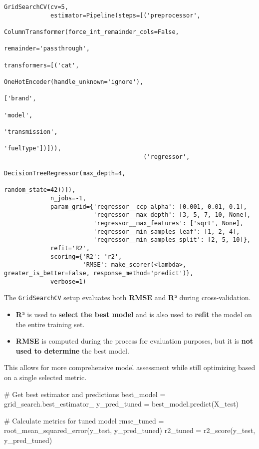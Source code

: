 \documentclass[
  letterpaper,
  DIV=11,
  numbers=noendperiod]{scrreprt}
\newenvironment{Shaded}{\begin{snugshade}}{\end{snugshade}}
\newcommand{\CommentTok}[1]{\textcolor[rgb]{0.37,0.37,0.37}{#1}}
\newcommand{\NormalTok}[1]{\textcolor[rgb]{0.00,0.23,0.31}{#1}}
\newcommand{\OperatorTok}[1]{\textcolor[rgb]{0.37,0.37,0.37}{#1}}
\providecommand{\tightlist}{%
  \setlength{\itemsep}{0pt}\setlength{\parskip}{0pt}}\usepackage{longtable,booktabs,array}
\begin{document}
\begin{verbatim}
GridSearchCV(cv=5,
             estimator=Pipeline(steps=[('preprocessor',
                                        ColumnTransformer(force_int_remainder_cols=False,
                                                          remainder='passthrough',
                                                          transformers=[('cat',
                                                                         OneHotEncoder(handle_unknown='ignore'),
                                                                         ['brand',
                                                                          'model',
                                                                          'transmission',
                                                                          'fuelType'])])),
                                       ('regressor',
                                        DecisionTreeRegressor(max_depth=4,
                                                              random_state=42))]),
             n_jobs=-1,
             param_grid={'regressor__ccp_alpha': [0.001, 0.01, 0.1],
                         'regressor__max_depth': [3, 5, 7, 10, None],
                         'regressor__max_features': ['sqrt', None],
                         'regressor__min_samples_leaf': [1, 2, 4],
                         'regressor__min_samples_split': [2, 5, 10]},
             refit='R2',
             scoring={'R2': 'r2',
                      'RMSE': make_scorer(<lambda>, greater_is_better=False, response_method='predict')},
             verbose=1)
\end{verbatim}

The \texttt{GridSearchCV} setup evaluates both \textbf{RMSE} and
\textbf{R²} during cross-validation.

\begin{itemize}
\tightlist
\item
  \textbf{R²} is used to \textbf{select the best model} and is also used
  to \textbf{refit} the model on the entire training set.
\item
  \textbf{RMSE} is computed during the process for evaluation purposes,
  but it is \textbf{not used to determine} the best model.
\end{itemize}

This allows for more comprehensive model assessment while still
optimizing based on a single selected metric.

\begin{Shaded}
\begin{Highlighting}[]
\CommentTok{\# Get best estimator and predictions}
\NormalTok{best\_model }\OperatorTok{=}\NormalTok{ grid\_search.best\_estimator\_}
\NormalTok{y\_pred\_tuned }\OperatorTok{=}\NormalTok{ best\_model.predict(X\_test)}

\CommentTok{\# Calculate metrics for tuned model}
\NormalTok{rmse\_tuned }\OperatorTok{=}\NormalTok{ root\_mean\_squared\_error(y\_test, y\_pred\_tuned)}
\NormalTok{r2\_tuned }\OperatorTok{=}\NormalTok{ r2\_score(y\_test, y\_pred\_tuned)}
\end{Highlighting}
\end{Shaded}
\end{document}
